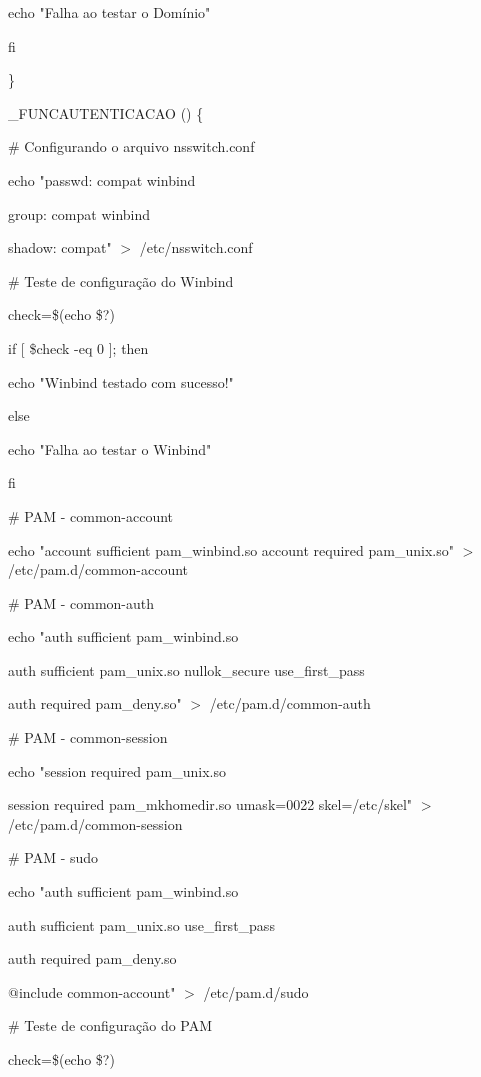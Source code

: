 {      echo "Falha ao testar o Domínio"

   fi

\}

\_FUNCAUTENTICACAO () \{

        \# Configurando o arquivo nsswitch.conf

        echo "passwd:         compat winbind

              group:          compat winbind

              shadow:         compat" $>$ /etc/nsswitch.conf

        \# Teste de configuração do Winbind        

        check=\$(echo \$?)
   		
		if [ \$check -eq 0 ]; then

      echo "Winbind testado com sucesso!"

   else

      echo "Falha ao testar o Winbind"

   fi

        \# PAM - common-account

        echo "account sufficient       pam\_winbind.so
              account required         pam\_unix.so" $>$ /etc/pam.d/common-account

        \# PAM - common-auth

        echo "auth sufficient pam\_winbind.so

              auth sufficient pam\_unix.so nullok\_secure use\_first\_pass

              auth required   pam\_deny.so" $>$ /etc/pam.d/common-auth

        \# PAM - common-session      

        echo "session required pam\_unix.so

              session required pam\_mkhomedir.so umask=0022 skel=/etc/skel" $>$ /etc/pam.d/common-session

        \# PAM - sudo

        echo "auth sufficient pam\_winbind.so

              auth sufficient pam\_unix.so use\_first\_pass

              auth required   pam\_deny.so

              $@$include common-account" $>$ /etc/pam.d/sudo

        \# Teste de configuração do PAM

        check=\$(echo \$?)

}

